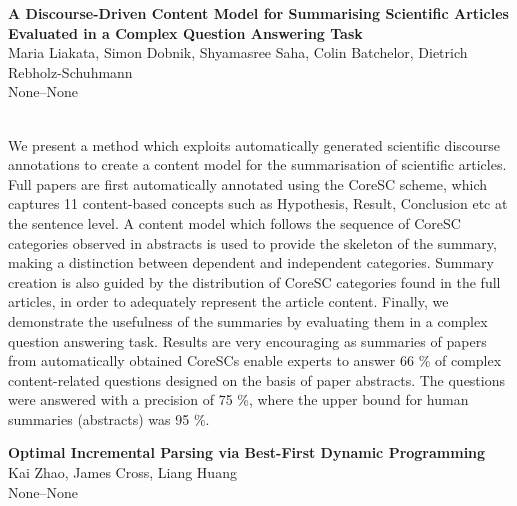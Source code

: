 \documentclass[twoside,makeidx]{book}
\begin{document}
\par\vspace{2em}\noindent%
\begin{minipage}{\linewidth}%
\begin{center}
\textbf{\normalsize A Discourse-Driven Content Model for Summarising Scientific Articles Evaluated in a Complex Question Answering Task}\\
\normalsize  Maria Liakata,  Simon Dobnik,  Shyamasree Saha,  Colin Batchelor,  Dietrich Rebholz-Schuhmann\\
{\small None--None}\\
\end{center}
\end{minipage}\\[0.5em]
\nopagebreak%
\noindent%
{\small We present a method which exploits automatically generated   scientific discourse annotations to create a content model for the   summarisation of scientific articles. Full papers are first   automatically annotated using the CoreSC scheme, which captures 11   content-based concepts such as Hypothesis, Result, Conclusion etc at   the sentence level. A content model which follows the sequence of   CoreSC categories observed in abstracts is used to provide the   skeleton of the summary, making a distinction between dependent and   independent categories. Summary creation is also guided by the   distribution of CoreSC categories found in the full articles, in   order to adequately represent the article content. Finally, we   demonstrate the usefulness of the summaries by evaluating them in a   complex question answering task. Results are very encouraging as   summaries of papers from automatically obtained CoreSCs enable   experts to answer 66 \% of complex content-related questions designed   on the basis of paper abstracts. The questions were answered with a   precision of 75 \%, where the upper bound for human summaries   (abstracts) was 95 \%.}
\par\vspace{2em}\noindent%
\begin{minipage}{\linewidth}%
\begin{center}
\textbf{\normalsize Optimal Incremental Parsing via Best-First Dynamic Programming}\\
\normalsize  Kai Zhao,  James Cross,  Liang Huang\\
{\small None--None}\\
\end{center}
\end{minipage}\\[0.5em]
\end{document}
